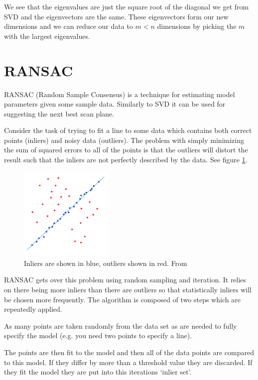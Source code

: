 We see that the eigenvalues are just the square root of the diagonal we get from SVD and the eigenvectors are the same. These eigenvectors form our new dimensions and we can reduce our data to $m < n$ dimensions by picking the $m$ with the largest eigenvalues.

\newpage
\section{RANSAC}\label{background:ransac}
RANSAC (Random Sample Consensus) is a technique for estimating model parameters given some sample data. Similarly to SVD it can be used for suggesting the next best scan plane.

Consider the task of trying to fit a line to some data which contains both correct points (inliers) and noisy data (outliers). The problem with simply minimizing the sum of squared errors to all of the points is that the outliers will distort the result such that the inliers are not perfectly described by the data. See figure \ref{fig:ransac}.

\begin{figure}[H]
    \centering
	\includegraphics[width=0.4\textwidth]{images/background/ransac.png}
    \caption{Inliers are shown in blue, outliers shown in red. From \cite{ransac:image}}
    \label{fig:ransac}
\end{figure}

RANSAC gets over this problem using random sampling and iteration. It relies on there being more inliers than there are outliers so that statistically inliers will be chosen more frequently. The algorithm is composed of two steps which are repeatedly applied.

As many points are taken randomly from the data set as are needed to fully specify the model (e.g. you need two points to specify a line).

The points are then fit to the model and then all of the data points are compared to this model. If they differ by more than a threshold value they are discarded. If they fit the model they are put into this iterations ‘inlier set’.

